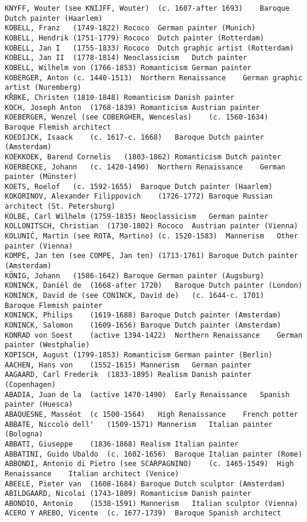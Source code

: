 \documentclass[11pt]{article}
\begin{document}
\begin{Verbatim}[commandchars=\\\{\}]
KNYFF, Wouter (see KNIJFF, Wouter)	(c. 1607-after 1693)	Baroque	Dutch painter (Haarlem)
KOBELL, Franz	(1749-1822)	Rococo	German painter (Munich)
KOBELL, Hendrik	(1751-1779)	Rococo	Dutch painter (Rotterdam)
KOBELL, Jan I	(1755-1833)	Rococo	Dutch graphic artist (Rotterdam)
KOBELL, Jan II	(1778-1814)	Neoclassicism	Dutch painter
KOBELL, Wilhelm von	(1766-1853)	Romanticism	German painter
KOBERGER, Anton	(c. 1440-1513)	Northern Renaissance	German graphic artist (Nuremberg)
KŘBKE, Christen	(1810-1848)	Romanticism	Danish painter
KOCH, Joseph Anton	(1768-1839)	Romanticism	Austrian painter
KOEBERGER, Wenzel (see COBERGHER, Wenceslas)	(c. 1560-1634)	Baroque	Flemish architect
KOEDIJCK, Isaack	(c. 1617-c. 1668)	Baroque	Dutch painter (Amsterdam)
KOEKKOEK, Barend Cornelis	(1803-1862)	Romanticism	Dutch painter
KOERBECKE, Johann	(c. 1420-1490)	Northern Renaissance	German painter (Münster)
KOETS, Roelof	(c. 1592-1655)	Baroque	Dutch painter (Haarlem)
KOKORINOV, Alexander Filippovich	(1726-1772)	Baroque	Russian architect (St. Petersburg)
KOLBE, Carl Wilhelm	(1759-1835)	Neoclassicism	German painter
KOLLONITSCH, Christian	(1730-1802)	Rococo	Austrian painter (Vienna)
KOLUNIĆ, Martin (see ROTA, Martino)	(c. 1520-1583)	Mannerism	Other painter (Vienna)
KOMPE, Jan ten (see COMPE, Jan ten)	(1713-1761)	Baroque	Dutch painter (Amsterdam)
KÖNIG, Johann	(1586-1642)	Baroque	German painter (Augsburg)
KONINCK, Daniël de	(1668-after 1720)	Baroque	Dutch painter (London)
KONINCK, David de (see CONINCK, David de)	(c. 1644-c. 1701)	Baroque	Flemish painter
KONINCK, Philips	(1619-1688)	Baroque	Dutch painter (Amsterdam)
KONINCK, Salomon	(1609-1656)	Baroque	Dutch painter (Amsterdam)
KONRAD von Soest	(active 1394-1422)	Northern Renaissance	German painter (Westphalie)
KOPISCH, August	(1799-1853)	Romanticism	German painter (Berlin)
AACHEN, Hans von	(1552-1615)	Mannerism	German painter
AAGAARD, Carl Frederik	(1833-1895)	Realism	Danish painter (Copenhagen)
ABADIA, Juan de la	(active 1470-1490)	Early Renaissance	Spanish painter (Huesca)
ABAQUESNE, Masséot	(c 1500-1564)	High Renaissance	French potter
ABBATE, Niccolò dell'	(1509-1571)	Mannerism	Italian painter (Bologna)
ABBATI, Giuseppe	(1836-1868)	Realism	Italian painter
ABBATINI, Guido Ubaldo	(c. 1602-1656)	Baroque	Italian painter (Rome)
ABBONDI, Antonio di Pietro (see SCARPAGNINO)	(c. 1465-1549)	High Renaissance	Italian architect (Venice)
ABEELE, Pieter van	(1608-1684)	Baroque	Dutch sculptor (Amsterdam)
ABILDGAARD, Nicolai	(1743-1809)	Romanticism	Danish painter
ABONDIO, Antonio	(1538-1591)	Mannerism	Italian sculptor (Vienna)
ACERO Y AREBO, Vicente	(c. 1677-1739)	Baroque	Spanish architect

\end{Verbatim}
\end{document}

